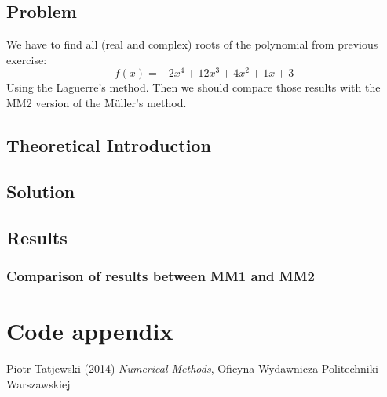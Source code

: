 \documentclass[12pt]{report}
\begin{document}
\section{Problem}
We have to find all (real and complex) roots of the polynomial from previous exercise:
\[ f(x) = -2x^4+12x^3+4x^2+1x+3 \]
Using the Laguerre's method. Then we should compare those results with the MM2 version of the  M{\"u}ller's method.


\section{Theoretical Introduction}
\section{Solution}
\section{Results}
\subsection{Comparison of results between MM1 and MM2}

\chapter{Code appendix}

\begin{thebibliography}{9}
Piotr Tatjewski (2014) \emph{Numerical Methods}, Oficyna Wydawnicza Politechniki Warszawskiej
\end{thebibliography}
\end{document}
